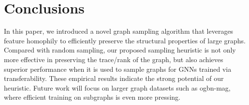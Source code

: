 \section{Conclusions}

In this paper, we introduced a novel graph sampling algorithm that leverages feature homophily to efficiently preserve the structural properties of large graphs. 
Compared with random sampling, our proposed sampling heuristic is not only more effective in preserving the trace/rank of the graph, but also achieves superior performance when it is used to sample graphs for GNNs trained via transferability. These empirical results indicate the strong potential of our heuristic. Future work will focus on larger graph datasets such as ogbn-mag, where efficient training on subgraphs is even more pressing.


